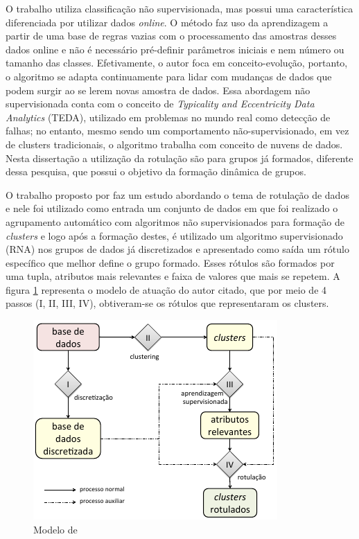 
O trabalho \cite{Costa2016} utiliza classificação não supervisionada, mas possui uma característica diferenciada por utilizar dados \textit{online}. O método faz uso da aprendizagem a partir de uma base de regras vazias com o processamento das amostras desses dados online e não é necessário pré-definir parâmetros iniciais e nem número ou tamanho das classes. Efetivamente, o autor foca em conceito-evolução, portanto, o algoritmo se adapta continuamente para lidar com mudanças de dados que podem surgir ao se lerem novas amostra de dados. Essa abordagem não supervisionada conta com o conceito de \textit{Typicality and Eccentricity Data Analytics} (TEDA), utilizado em problemas no mundo real como detecção de falhas; no entanto, mesmo sendo um comportamento não-supervisionado, em vez de clusters tradicionais, o algoritmo trabalha com conceito de nuvens de dados. Nesta dissertação a utilização da rotulação são para grupos já formados, diferente dessa pesquisa, que possui o objetivo da formação dinâmica de grupos.



O trabalho proposto por \cite{Lopes2016} faz um estudo abordando o tema de rotulação de dados e nele foi utilizado como entrada um conjunto de dados em que foi realizado o agrupamento automático com algoritmos não supervisionados para formação de \textit{clusters} e logo após a formação destes, é utilizado um algoritmo supervisionado (RNA) nos grupos de dados já discretizados e apresentado como saída um rótulo específico que melhor define o grupo formado. Esses rótulos são formados por uma tupla, atributos mais relevantes e faixa de valores que mais se repetem. A figura \ref{fig:modeloLOPES} representa o modelo de atuação do autor citado, que por meio de 4 passos (I, II, III, IV),  obtiveram-se os rótulos que representaram os clusters. 
\begin{figure}[h]
        \centering
        \includegraphics[scale=1]{figs/modeloLopes.png}
        \caption{Modelo de \cite{Lopes2016}} 
        \label{fig:modeloLOPES}
\end{figure}

